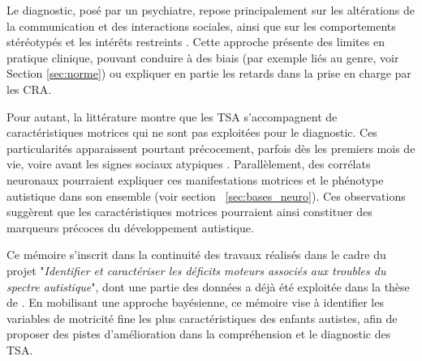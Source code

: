 \documentclass[11pt]{report}
\begin{document}
\bigskip

Le diagnostic, posé par un psychiatre, repose principalement sur les altérations de la communication et des interactions sociales, ainsi que sur les comportements stéréotypés et les intérêts restreints \parencite[p.~56–58]{apa_diagnostic_2022}. Cette approche présente des limites en pratique clinique, pouvant conduire à des biais (par exemple liés au genre, voir Section \ref{sec:norme}) ou expliquer en partie les retards dans la prise en charge par les CRA.

\bigskip

Pour autant, la littérature montre que les TSA s'accompagnent de caractéristiques motrices qui ne sont pas exploitées pour le diagnostic. Ces particularités apparaissent pourtant précocement, parfois dès les premiers mois de vie, voire avant les signes sociaux atypiques \parencite{Zwaigenbaum2015Oct, AlSagheer2018Sep}. Parallèlement, des corrélats neuronaux pourraient expliquer ces manifestations motrices et le phénotype autistique dans son ensemble (voir section~ \ref{sec:bases_neuro}). Ces observations suggèrent que les caractéristiques motrices pourraient ainsi constituer des marqueurs précoces du développement autistique.


\bigskip

Ce mémoire s'inscrit dans la continuité des travaux réalisés dans le cadre du projet "\textit{Identifier et caractériser les déficits moteurs associés aux troubles du spectre autistique}", dont une partie des données a déjà été exploitée dans la thèse de \textcite{benchekri_mieux_2024}. En mobilisant une approche bayésienne, ce mémoire vise à identifier les variables de motricité fine les plus caractéristiques des enfants autistes, afin de proposer des pistes d'amélioration dans la compréhension et le diagnostic des TSA.



\end{document}
